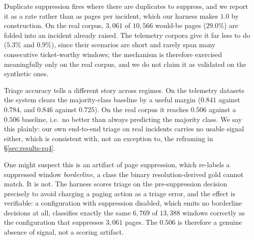Duplicate suppression fires where there are duplicates to suppress, and we report
it as a rate rather than as pages per incident, which our harness makes $1.0$ by
construction. On the real corpus, $3{,}061$ of $10{,}566$ would-be pages
($29.0\%$) are folded into an incident already raised. The telemetry corpora give
it far less to do ($5.3\%$ and $0.9\%$), since their scenarios are short and
rarely span many consecutive ticket-worthy windows; the mechanism is therefore
exercised meaningfully only on the real corpus, and we do not claim it as
validated on the synthetic ones.

Triage accuracy tells a different story across regimes. On the telemetry datasets
the system clears the majority-class baseline by a useful margin ($0.841$ against
$0.784$, and $0.846$ against $0.725$). On the real corpus it reaches $0.506$
against a $0.506$ baseline, i.e.\ no better than always predicting the majority
class. We say this plainly: our own end-to-end triage on real incidents carries
no usable signal either, which is consistent with, not an exception to, the
reframing in \S\ref{sec:results-rq4}.

One might suspect this is an artifact of page suppression, which re-labels a
suppressed window \emph{borderline}, a class the binary resolution-derived gold
cannot match. It is not. The harness scores triage on the pre-suppression
decision precisely to avoid charging a paging action as a triage error, and the
effect is verifiable: a configuration with suppression disabled, which emits no
borderline decisions at all, classifies exactly the same $6{,}769$ of $13{,}388$
windows correctly as the configuration that suppresses $3{,}061$ pages. The
$0.506$ is therefore a genuine absence of signal, not a scoring artifact.

